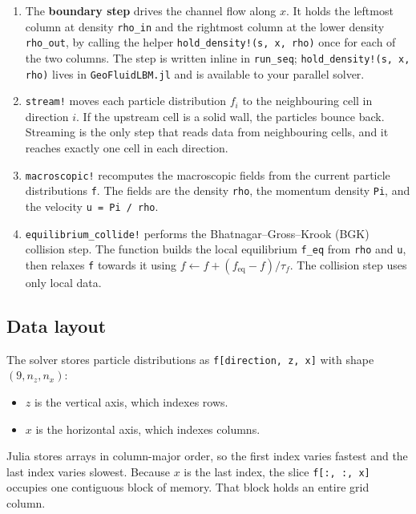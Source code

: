 \documentclass[11pt]{article}
\begin{document}
\begin{enumerate}
  \item The \textbf{boundary step} drives the channel flow along $x$. It holds the leftmost column
        at density \texttt{rho\_in} and the rightmost column at the lower density
        \texttt{rho\_out}, by calling the helper \texttt{hold\_density!(s, x, rho)} once for each
        of the two columns. The step is written inline in \texttt{run\_seq}; \texttt{hold\_density!(s, x, rho)}
        lives in \texttt{GeoFluidLBM.jl} and is available to your parallel solver.
  \item \texttt{stream!} moves each particle distribution $f_i$ to the neighbouring cell in
        direction $i$. If the upstream cell is a solid wall, the particles bounce back. Streaming
        is the only step that reads data from neighbouring cells, and it reaches exactly one cell
        in each direction.
  \item \texttt{macroscopic!} recomputes the macroscopic fields from the current particle
        distributions \texttt{f}. The fields are the density \texttt{rho}, the momentum density
        \texttt{Pi}, and the velocity \texttt{u = Pi / rho}.
  \item \texttt{equilibrium\_collide!} performs the Bhatnagar--Gross--Krook (BGK) collision step.
        The function builds the local equilibrium \texttt{f\_eq} from \texttt{rho} and \texttt{u},
        then relaxes \texttt{f} towards it using
        $f \leftarrow f + (f_{\mathrm{eq}} - f)/\tau_f$. The collision step uses only local data.
\end{enumerate}

\subsection*{Data layout}

The solver stores particle distributions as \texttt{f[direction, z, x]} with shape
$(9, n_z, n_x)$:

\begin{itemize}
  \item $z$ is the vertical axis, which indexes rows.
  \item $x$ is the horizontal axis, which indexes columns.
\end{itemize}

Julia stores arrays in column-major order, so the first index varies fastest and the last index
varies slowest. Because $x$ is the last index, the slice \texttt{f[:, :, x]} occupies one contiguous
block of memory. That block holds an entire grid column.
\end{document}
